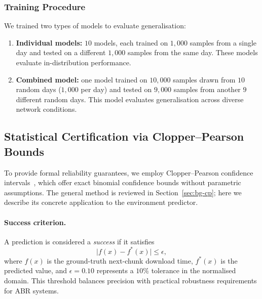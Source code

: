 \documentclass[thesis]{uofithesis} %
\begin{document}
    \subsubsection{Training Procedure}
    \label{sec:env-training}

    We trained two types of models to evaluate generalisation:
    \begin{enumerate}
        \item \textbf{Individual models:} $10$ models, each trained on
            $1{,}000$ samples from a single day and tested on a different
            $1{,}000$ samples from the same day.  These models evaluate
            in-distribution performance.
        \item \textbf{Combined model:} one model trained on $10{,}000$
            samples drawn from $10$ random days ($1{,}000$ per day) and
            tested on $9{,}000$ samples from another $9$ different random
            days.  This model evaluates generalisation across diverse
            network conditions.
    \end{enumerate}


    \subsection{Statistical Certification via Clopper--Pearson Bounds}
    \label{sec:env-certification}

    To provide formal reliability guarantees, we employ Clopper--Pearson
    confidence intervals~\cite{clopper-pearson}, which offer exact binomial
    confidence bounds without parametric assumptions.  The general method is
    reviewed in Section~\ref{sec:bg-cp}; here we describe its concrete
    application to the environment predictor.

    \paragraph{Success criterion.}
    A prediction is considered a \emph{success} if it satisfies
    \begin{equation}
        \lvert f(x) - f^{\ast}(x) \rvert \leq \epsilon,
        \label{eq:env-success}
    \end{equation}
    where $f(x)$ is the ground-truth next-chunk download time,
    $f^{\ast}(x)$ is the predicted value, and $\epsilon = 0.10$ represents
    a $10\%$ tolerance in the normalised domain.  This threshold balances
    precision with practical robustness requirements for ABR systems.
\end{document}
